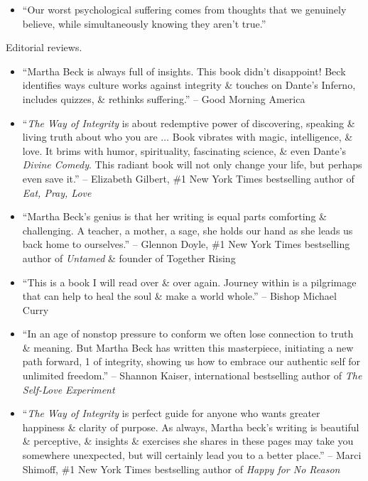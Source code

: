 \documentclass{article}
\begin{document}
\begin{enumerate}
\begin{itemize}
		-- Bất cứ điều gì bạn làm chỉ để gây ảnh hưởng đến người khác, thay vì thể hiện bản chất thật của mình, đều là 1 sự hối hả.
		\item ``Our worst psychological suffering comes from thoughts that we genuinely believe, while simultaneously knowing they aren't true.''
	\end{itemize}
	{\sf Editorial reviews.}
	\begin{itemize}
		\item ``{\sc Martha Beck} is always full of insights. This book didn't disappoint! {\sc Beck} identifies ways culture works against integrity \& touches on {\sc Dante}'s Inferno, includes quizzes, \& rethinks suffering.'' -- Good Morning America
		\item ``{\it The Way of Integrity} is about redemptive power of discovering, speaking \& living truth about who you are $\ldots$ Book vibrates with magic, intelligence, \& love. It brims with humor, spirituality, fascinating science, \& even {\sc Dante}'s {\it Divine Comedy}. This radiant book will not only change your life, but perhaps even save it.'' -- {\sc Elizabeth Gilbert}, \#1 New York Times bestselling author of {\it Eat, Pray, Love}
		\item ``{\sc Martha Beck}'s genius is that her writing is equal parts comforting \& challenging. A teacher, a mother, a sage, she holds our hand as she leads us back home to ourselves.'' -- {\sc Glennon Doyle}, \#1 New York Times bestselling author of {\it Untamed} \& founder of Together Rising
		\item ``This is a book I will read over \& over again. Journey within is a pilgrimage that can help to heal the soul \& make a world whole.'' -- {\sc Bishop Michael Curry}
		\item ``In an age of nonstop pressure to conform we often lose connection to truth \& meaning. But {\sc Martha Beck} has written this masterpiece, initiating a new path forward, 1 of integrity, showing us how to embrace our authentic self for unlimited freedom.'' -- {\sc Shannon Kaiser}, international bestselling author of {\it The Self-Love Experiment}
		\item ``{\it The Way of Integrity} is perfect guide for anyone who wants greater happiness \& clarity of purpose. As always, {\sc Martha beck}'s writing is beautiful \& perceptive, \& insights \& exercises she shares in these pages may take you somewhere unexpected, but will certainly lead you to a better place.'' -- {\sc Marci Shimoff}, \#1 New York Times bestselling author of {\it Happy for No Reason}

\end{itemize}
\end{enumerate}
\end{document}
